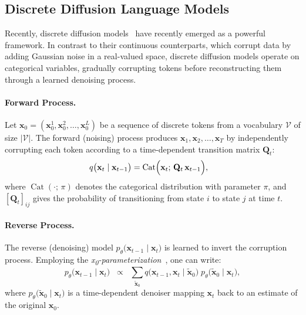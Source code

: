 \subsection{Discrete Diffusion Language Models}
Recently, discrete diffusion models~\citep{d3pm} have recently emerged as a powerful framework. In contrast to their continuous counterparts, which corrupt data by adding Gaussian noise in a real-valued space, discrete diffusion models operate on categorical variables, gradually corrupting tokens before reconstructing them through a learned denoising process.

\paragraph{Forward Process.}
Let \(\mathbf{x}_0 = (\mathbf{x}_0^1, \mathbf{x}_0^2, \ldots, \mathbf{x}_0^L)\) be a sequence of discrete tokens from a vocabulary \(\mathcal{V}\) of size \(|\mathcal{V}|\). The forward (noising) process produces \(\mathbf{x}_1, \mathbf{x}_2, \ldots, \mathbf{x}_T\) by independently corrupting each token according to a time-dependent transition matrix \(\mathbf{Q}_t\):
\begin{align}
    q\bigl(\mathbf{x}_t \mid \mathbf{x}_{t-1}\bigr)
    &= \operatorname{Cat}\Bigl(\mathbf{x}_{t};\, \mathbf{Q}_t \,\mathbf{x}_{t-1}\Bigr),
\end{align}
where \(\operatorname{Cat}(\cdot;\,\pi)\) denotes the categorical distribution with parameter \(\pi\), and \([\mathbf{Q}_t]_{ij}\) gives the probability of transitioning from state \(i\) to state \(j\) at time \(t\).


\paragraph{Reverse Process.}
The reverse (denoising) model \(p_\theta\bigl(\mathbf{x}_{t-1} \mid \mathbf{x}_t\bigr)\) is learned to invert the corruption process. Employing the \textit{x\textsubscript{0}-parameterization}~\cite{d3pm}, one can write:
\begin{equation}
    p_\theta\bigl(\mathbf{x}_{t-1} \mid \mathbf{x}_t\bigr) 
    \;\;\propto\;\; 
    \sum_{\widetilde{\mathbf{x}}_0} 
    q\bigl(\mathbf{x}_{t-1}, \mathbf{x}_t \mid \widetilde{\mathbf{x}}_0\bigr)\;
    p_\theta\bigl(\widetilde{\mathbf{x}}_0 \mid \mathbf{x}_t\bigr),
\end{equation}
where \(p_\theta\bigl(\widetilde{\mathbf{x}}_0 \mid \mathbf{x}_t\bigr)\) is a time-dependent denoiser mapping \(\mathbf{x}_t\) back to an estimate of the original \(\mathbf{x}_0\).

